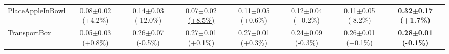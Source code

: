 \begin{table}[htbp]
\begin{adjustbox}{max width=\textwidth}
\begin{tabular}{l*{7}{c}}
PlaceAppleInBowl & 0.08$\pm$0.02 \scriptsize{(+4.2\%)} & 0.14$\pm$0.03 \scriptsize{(-12.0\%)} & \underline{0.07$\pm$0.02 \scriptsize{(+8.5\%)}} & 0.11$\pm$0.05 \scriptsize{(+0.6\%)} & 0.12$\pm$0.04 \scriptsize{(+0.2\%)} & 0.11$\pm$0.05 \scriptsize{(-8.2\%)} & \textbf{0.32$\pm$0.17 \scriptsize{(+1.7\%)}} \\
TransportBox & \underline{0.05$\pm$0.03 \scriptsize{(+0.8\%)}} & 0.26$\pm$0.07 \scriptsize{(-0.5\%)} & 0.27$\pm$0.01 \scriptsize{(+0.1\%)} & 0.27$\pm$0.01 \scriptsize{(+0.3\%)} & 0.24$\pm$0.09 \scriptsize{(-0.3\%)} & 0.26$\pm$0.01 \scriptsize{(+0.1\%)} & \textbf{0.28$\pm$0.01 \scriptsize{(-0.1\%)}} \\
\bottomrule
\end{tabular}
\end{adjustbox}
\end{table}

